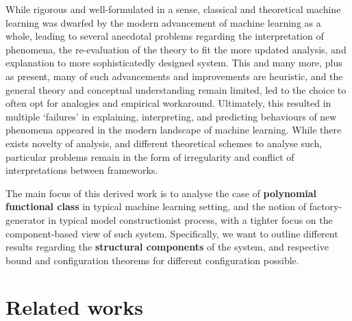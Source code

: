 \documentclass[
  journal=largetwo,
  year=2025,
  volume=37,
]{cup-journal}
\begin{document}
While rigorous and well-formulated in a sense, classical and theoretical machine learning was dwarfed by the modern advancement of machine learning as a whole, leading to several anecdotal problems regarding the interpretation of phenomena, the re-evaluation of the theory to fit the more updated analysis, and explanation to more sophisticatedly designed system. This and many more, plus as present, many of such advancements and improvements are heuristic, and the general theory and conceptual understanding remain limited, led to the choice to often opt for analogies and empirical workaround. Ultimately, this resulted in multiple `failures' in explaining, interpreting, and predicting behaviours of new phenomena appeared in the modern landscape of machine learning. While there exists novelty of analysis, and different theoretical schemes to analyse such, particular problems remain in the form of irregularity and conflict of interpretations between frameworks. 

The main focus of this derived work is to analyse the case of \textbf{polynomial functional class} in typical machine learning setting, and the notion of factory-generator in typical model constructionist process, with a tighter focus on the component-based view of such system. Specifically, we want to outline different results regarding the \textbf{structural components} of the system, and respective bound and configuration theorems for different configuration possible.

\section{Related works}
\end{document}
